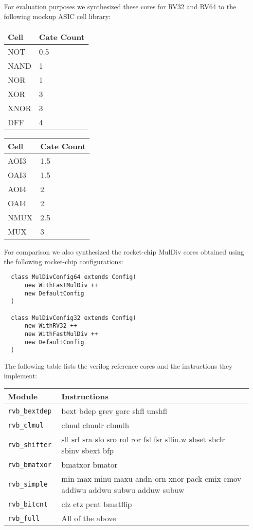 For evaluation purposes we synthesized these cores for RV32 and RV64 to the following mockup ASIC cell library:

\begin{center}
\begin{tabular}{ll}
Cell & Cate Count \\
\hline
NOT   & 0.5 \\
NAND  & 1   \\
NOR   & 1   \\
XOR   & 3   \\
XNOR  & 3   \\
DFF   & 4   \\
\end{tabular}
\hfil
\begin{tabular}{ll}
Cell & Cate Count \\
\hline
AOI3  & 1.5 \\
OAI3  & 1.5 \\
AOI4  & 2   \\
OAI4  & 2   \\
NMUX  & 2.5 \\
MUX   & 3 \\
\end{tabular}
\end{center}

For comparison we also synthesized the rocket-chip MulDiv cores obtained using the following
rocket-chip configurations:

\begin{verbatim}
  class MulDivConfig64 extends Config(
      new WithFastMulDiv ++
      new DefaultConfig
  )

  class MulDivConfig32 extends Config(
      new WithRV32 ++
      new WithFastMulDiv ++
      new DefaultConfig
  )
\end{verbatim}

The following table lists the verilog reference cores and the instructions they implement:

\begin{center}
\begin{tabular}{lp{6cm}}
Module & Instructions \\
\hline
\tt rvb\_bextdep  & bext bdep grev gorc shfl unshfl                                               \\
\tt rvb\_clmul    & clmul clmulr clmulh                                                           \\
\tt rvb\_shifter  & sll srl sra slo sro rol ror fsl fsr slliu.w sbset sbclr sbinv sbext bfp       \\
\tt rvb\_bmatxor  & bmatxor bmator                                                                \\
\tt rvb\_simple   & min max minu maxu andn orn xnor pack cmix cmov addiwu addwu subwu adduw subuw \\
\tt rvb\_bitcnt   & clz ctz pcnt bmatflip                                                         \\
\tt rvb\_full     & All of the above                                                              \\
\end{tabular}
\end{center}

